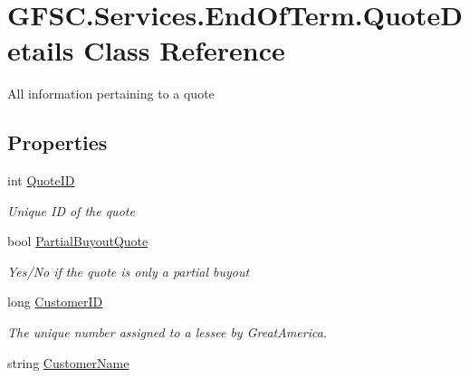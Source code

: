 \hypertarget{class_g_f_s_c_1_1_services_1_1_end_of_term_1_1_quote_details}{}\section{G\+F\+S\+C.\+Services.\+End\+Of\+Term.\+Quote\+Details Class Reference}
\label{class_g_f_s_c_1_1_services_1_1_end_of_term_1_1_quote_details}


All information pertaining to a quote  


\subsection*{Properties}
\begin{DoxyCompactItemize}
\item 
int \mbox{\hyperlink{class_g_f_s_c_1_1_services_1_1_end_of_term_1_1_quote_details_a24a852adaf0bb43b850fd2a33762a884}{Quote\+ID}}
\begin{DoxyCompactList}\small\item\em Unique ID of the quote \end{DoxyCompactList}\item 
bool \mbox{\hyperlink{class_g_f_s_c_1_1_services_1_1_end_of_term_1_1_quote_details_a1f9b13e9e9bd8fc1a4d694d51bedf1f7}{Partial\+Buyout\+Quote}}
\begin{DoxyCompactList}\small\item\em Yes/\+No if the quote is only a partial buyout \end{DoxyCompactList}\item 
long \mbox{\hyperlink{class_g_f_s_c_1_1_services_1_1_end_of_term_1_1_quote_details_a6d2f989ace33612425ebe9ac7359ea41}{Customer\+ID}}
\begin{DoxyCompactList}\small\item\em The unique number assigned to a lessee by Great\+America. \end{DoxyCompactList}\item 
string \mbox{\hyperlink{class_g_f_s_c_1_1_services_1_1_end_of_term_1_1_quote_details_aa701498796b2489ea7eeabe8fd9ab653}{Customer\+Name}}

\end{DoxyCompactItemize}
